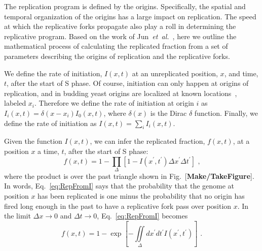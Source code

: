		The replication program is defined by the origins.
		Specifically, the spatial and temporal organization of the origins has a large impact on replication.
		The speed at which the replicative forks propagate also play a roll in determining the replicative program.
		Based on the work of Jun~\emph{et~al.}~\cite{KJMA1}, here we outline the mathematical process of calculating the replicated fraction from a set of parameters describing the origins of replication and the replicative forks.
		
		We define the rate of initiation, $I(x,t)$ at an unreplicated position, $x$, and time, $t$, after the start of S phase.
		Of course, initiation can only happen at origins of replication, and in budding yeast origins are localized at known locations~\cite{OriDB}, labeled $x_i$.
		Therefore we define the rate of initiation at origin $i$ as $I_i(x,t)=\delta(x-x_i)I_0(x,t)$, where $\delta(x)$ is the Dirac $\delta$ function.
		Finally, we define the rate of initiation as $I(x,t) = \sum\limits_i I_i(x,t)$.
		
		Given the function $I(x,t)$, we can infer the replicated fraction, $f(x,t)$, at a position $x$ a time, $t$, after the start of S phase:
		\begin{equation} \label{eq:RepFromI}
			f\left( x,t\right) = 1 - \prod_\Delta\left[1-I\left( x^\prime,t^\prime\right)\Delta x^\prime\Delta t^\prime\right] \text{ ,}
		\end{equation}
		where the product is over the past triangle shown in Fig.~[\textbf{Make/TakeFigure}].
		In words, Eq.~\ref{eq:RepFromI} says that the probability that the genome at position $x$ has been replicated is one minus the probability that no origin has fired long enough in the past to have a replicative fork pass over position $x$.
		In the limit $\Delta x\rightarrow0$ and $\Delta t\rightarrow0$, Eq.~\ref{eq:RepFromI} becomes
		\begin{equation} \label{eq:RepFromIexp}
			f\left( x,t\right) = 1 - \exp\left[-\iint\limits_\Delta dx^\prime dt^\prime I\left( x^\prime,t^\prime\right)\right] \text{ .}
		\end{equation}
		

